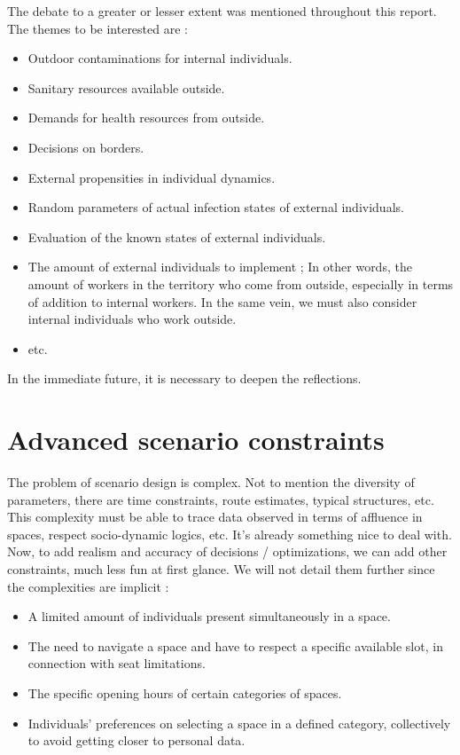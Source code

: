 The debate to a greater or lesser extent was mentioned throughout this report. The themes to be interested are :\\
\begin{itemize}
\item Outdoor contaminations for internal individuals.
\item Sanitary resources available outside.
\item Demands for health resources from outside.
\item Decisions on borders.
\item External propensities in individual dynamics.
\item Random parameters of actual infection states of external individuals.
\item Evaluation of the known states of external individuals.
\item The amount of external individuals to implement ; In other words, the amount of workers in the territory who come from outside, especially in terms of addition to internal workers. In the same vein, we must also consider internal individuals who work outside.
\item etc.\\
\end{itemize}

In the immediate future, it is necessary to deepen the reflections.\\

\newpage

\section{Advanced scenario constraints}

The problem of scenario design is complex. Not to mention the diversity of parameters, there are time constraints, route estimates, typical structures, etc. This complexity must be able to trace data observed in terms of affluence in spaces, respect socio-dynamic logics, etc. It's already something nice to deal with.\\

Now, to add realism and accuracy of decisions / optimizations, we can add other constraints, much less fun at first glance. We will not detail them further since the complexities are implicit :\\
\begin{itemize}
\item A limited amount of individuals present simultaneously in a space.
\item The need to navigate a space and have to respect a specific available slot, in connection with seat limitations.
\item The specific opening hours of certain categories of spaces.
\item Individuals' preferences on selecting a space in a defined category, collectively to avoid getting closer to personal data.\\
\end{itemize}

